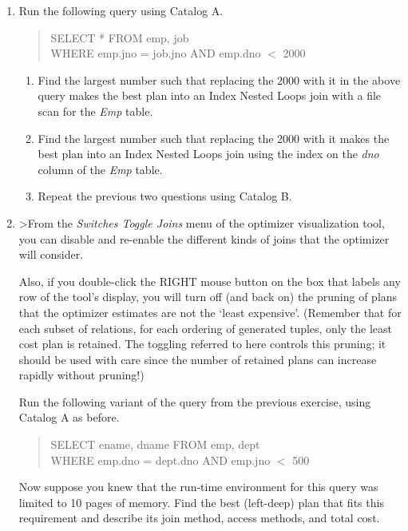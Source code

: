 \begin{enumerate}
\item

Run the following query using Catalog A.
\begin{quote}
	SELECT * FROM emp, job\\
	WHERE emp.jno = job.jno AND emp.dno $<$ 2000
\end{quote}

\begin{enumerate}
\item
Find the largest number such that replacing the 2000 with it in the above
query makes the best plan into an Index Nested Loops join with a file
scan for the {\em Emp} table.
\item
Find the largest number such that replacing the 2000 with it makes the
best plan into an Index Nested Loops join using the index on the {\em dno}
column of the {\em Emp} table.
\item
Repeat the previous two questions using Catalog B.
\end{enumerate}


\item

>From the {\em Switches \/ Toggle Joins} menu of the optimizer visualization tool,
you can disable and re-enable the different kinds of joins that the
optimizer will consider.

Also, if you double-click the RIGHT mouse button on the box that labels any
row of the tool's display, you will turn off (and back on) the pruning of plans
that the optimizer estimates are not the `least expensive'.  (Remember that
for each subset of relations, for each ordering of generated tuples,
only the least cost plan is retained.  The toggling referred to here
controls this pruning; it should be used with care since the number
of retained plans can increase rapidly without pruning!)

Run the following variant of the query from the previous
exercise, using Catalog A as before.  
\begin{quote}
        SELECT ename, dname FROM emp, dept\\
        WHERE emp.dno = dept.dno AND emp.jno $<$ 500
\end{quote}

Now suppose you knew that the run-time environment for this query
was limited to 10 pages of memory.  Find the best (left-deep) plan that fits
this requirement and describe its join method, access methods, and total cost.



\end{enumerate}
